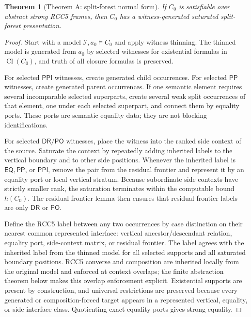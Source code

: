 \documentclass[11pt]{article}
\newtheorem{theorem}{Theorem}[section]
\newcommand{\EQ}{\mathsf{EQ}}
\newcommand{\PP}{\mathsf{PP}}
\newcommand{\PPI}{\mathsf{PPI}}
\newcommand{\PO}{\mathsf{PO}}
\newcommand{\DR}{\mathsf{DR}}
\newcommand{\Cl}{\operatorname{Cl}}
\begin{document}
\begin{theorem}[Theorem A: split-forest normal form]
If $C_0$ is satisfiable over abstract strong RCC5 frames, then $C_0$ has a witness-generated saturated split-forest presentation.
\end{theorem}

\begin{proof}
Start with a model $\mathcal I,a_0\models C_0$ and apply witness thinning.  The thinned model is generated from $a_0$ by selected witnesses for existential formulas in $\Cl(C_0)$, and truth of all closure formulas is preserved.

For selected $\PPI$ witnesses, create generated child occurrences.  For selected $\PP$ witnesses, create generated parent occurrences.  If one semantic element requires several incomparable selected superparts, create several weak split occurrences of that element, one under each selected superpart, and connect them by equality ports.  These ports are semantic equality data; they are not blocking identifications.

For selected $\DR/\PO$ witnesses, place the witness into the ranked side context of the source.  Saturate the context by repeatedly adding inherited labels to the vertical boundary and to other side positions.  Whenever the inherited label is $\EQ,\PP$, or $\PPI$, remove the pair from the residual frontier and represent it by an equality port or local vertical stratum.  Because subordinate side contexts have strictly smaller rank, the saturation terminates within the computable bound $h(C_0)$.  The residual-frontier lemma then ensures that residual frontier labels are only $\DR$ or $\PO$.

Define the RCC5 label between any two occurrences by case distinction on their nearest common represented interface: vertical ancestor/descendant relation, equality port, side-context matrix, or residual frontier.  The label agrees with the inherited label from the thinned model for all selected supports and all saturated boundary positions.  RCC5 converse and composition are inherited locally from the original model and enforced at context overlaps; the finite abstraction theorem below makes this overlap enforcement explicit.  Existential supports are present by construction, and universal restrictions are preserved because every generated or composition-forced target appears in a represented vertical, equality, or side-interface class.  Quotienting exact equality ports gives strong equality.
\end{proof}
\end{document}
